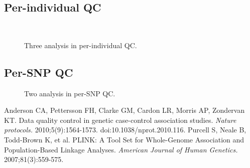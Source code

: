 \documentclass{article}
\begin{document}
\subsection{Per-individual QC}

\begin{figure}[h]
    \centering
    \\
    \caption{Three analysis in per-individual QC.}
\end{figure}
\subsection{Per-SNP QC}
\begin{figure}[h]
    \centering
    \caption{Two analysis in per-SNP QC.}
\end{figure}
\begin{thebibliography}{1}
 Anderson CA, Pettersson FH, Clarke GM, Cardon LR, Morris AP, Zondervan KT. {Data quality control in genetic case-control association studies. 
\em Nature protocols.} 2010;5(9):1564-1573. doi:10.1038/nprot.2010.116.
 Purcell S, Neale B, Todd-Brown K, et al. {PLINK: A Tool Set for Whole-Genome Association and Population-Based Linkage Analyses. 
\em American Journal of Human Genetics.} 2007;81(3):559-575.
\end{thebibliography}
\end{document}
